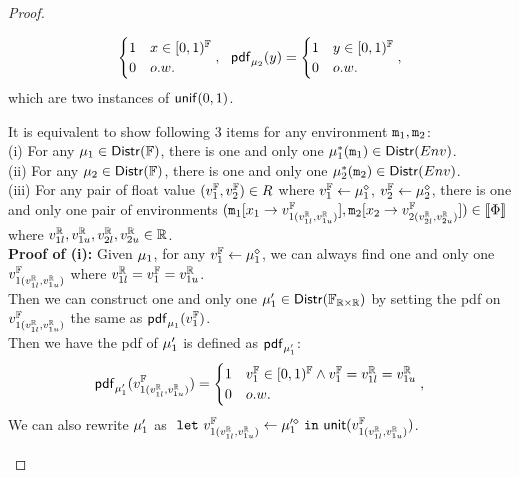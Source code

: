 \documentclass[a4paper,11pt]{article}
\begin{document}
\begin{proof}
\begin{itemize}
\[\begin{cases}
		1 & x \in [0, 1)^{\mathbb{F}} 
		\\
		0       & o.w.
		\end{cases} ,
		~~
		\mathsf{pdf}_{\mu_2}(y) = 
		\begin{cases}
		1 & y \in [0, 1)^{\mathbb{F}}
		\\
		0       & o.w.
		\end{cases},
	\]
	which are two instances of $\mathsf{unif}(0, 1)$.
	\begin{subproof}
	It is equivalent to show following 3 items for any environment $\mathtt{m}_1, \mathtt{m}_2$:
	\\
	(i) For any $\mu_1 \in \mathsf{Distr}(\mathbb{F})$, there is one and only one $\mu^*_1(\mathtt{m}_1) \in \mathsf{Distr}(Env)$.
	\\
	(ii) For any $\mu_2 \in \mathsf{Distr}(\mathbb{F})$, there is one and only one $\mu^*_2(\mathtt{m}_2) \in \mathsf{Distr}(Env)$.
	\\
	(iii) For any pair of float value $(v^{\mathbb{F}}_1, v^{\mathbb{F}}_2) \in R$ where 
	$v^{\mathbb{F}}_1 \leftarrow \mu_1^{\diamond}$, $v^{\mathbb{F}}_2 \leftarrow \mu_2^{\diamond}$,
	there is one and only one pair of environments 
	$(\mathtt{m}_1[ x_1 \to v^{\mathbb{F}}_{1(v^{\mathbb{R}}_{1l}, v^{\mathbb{R}}_{1u})}], \mathtt{m}_2[x_2 \to v^{\mathbb{F}}_{2(v^{\mathbb{R}}_{2l}, v^{\mathbb{R}}_{2u})}]) \in \llbracket \Phi \rrbracket$
	where $v^{\mathbb{R}}_{1l}, v^{\mathbb{R}}_{1u}, v^{\mathbb{R}}_{2l}, v^{\mathbb{R}}_{2u} \in \mathbb{R}$.
	\\ 
	\textbf{Proof of (i):} Given $\mu_1$, for any $v^{\mathbb{F}}_1 \leftarrow \mu_1^{\diamond}$, we can always find one and only one $v^{\mathbb{F}}_{1(v^{\mathbb{R}}_{1l}, v^{\mathbb{R}}_{1u})}$ where $v^{\mathbb{R}}_{1l} = v^{\mathbb{F}}_1 = v^{\mathbb{R}}_{1u}$.
	\\
	Then we can construct one and only one $\mu'_1 \in \mathsf{Distr}(\mathbb{F}_{\mathbb{R} \times \mathbb{R}})$
	by setting the pdf on $v^{\mathbb{F}}_{1(v^{\mathbb{R}}_{1l}, v^{\mathbb{R}}_{1u})}$ the same as $\mathsf{pdf}_{\mu_1}(v^{\mathbb{F}}_1)$. 
	\\
	Then we have the pdf of $\mu'_1$  
	is defined as $\mathsf{pdf}_{\mu'_1}$:
	\[
	\mathsf{pdf}_{\mu'_1}(v^{\mathbb{F}}_{1(v^{\mathbb{R}}_{1l}, v^{\mathbb{R}}_{1u})}) = 
		\begin{cases}
		1 & v^{\mathbb{F}}_1 \in [0, 1)^{\mathbb{F}}
		\land  v^{\mathbb{F}}_1 = v^{\mathbb{R}}_{1l} = v^{\mathbb{R}}_{1u}
		\\
		0       & o.w.
		\end{cases},
	\]
	We can also rewrite $\mu'_1$ as 
	$~\mathtt{let}~ v^{\mathbb{F}}_{1(v^{\mathbb{R}}_{1l}, v^{\mathbb{R}}_{1u})} \leftarrow \mu'^{\diamond}_1 
	~\mathtt{in}~ \mathsf{unit}(v^{\mathbb{F}}_{1(v^{\mathbb{R}}_{1l}, v^{\mathbb{R}}_{1u})})$.

\end{subproof}
\end{itemize}
\end{proof}
\end{document}
